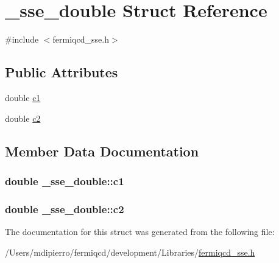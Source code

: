 \hypertarget{struct__sse__double}{
\section{\_\-sse\_\-double Struct Reference}
\label{struct__sse__double}
}


{\ttfamily \#include $<$fermiqcd\_\-sse.h$>$}\subsection*{Public Attributes}
\begin{DoxyCompactItemize}
\item 
double \hyperlink{struct__sse__double_ae836d9b3bbe4d5dd56db23bad413eab2}{c1}
\item 
double \hyperlink{struct__sse__double_aa9626ee275f9a06ca1f1b81a66af19d4}{c2}
\end{DoxyCompactItemize}


\subsection{Member Data Documentation}
\hypertarget{struct__sse__double_ae836d9b3bbe4d5dd56db23bad413eab2}{
\subsubsection[{c1}]{\setlength{\rightskip}{0pt plus 5cm}double {\bf \_\-sse\_\-double::c1}}}
\label{struct__sse__double_ae836d9b3bbe4d5dd56db23bad413eab2}
\hypertarget{struct__sse__double_aa9626ee275f9a06ca1f1b81a66af19d4}{
\subsubsection[{c2}]{\setlength{\rightskip}{0pt plus 5cm}double {\bf \_\-sse\_\-double::c2}}}
\label{struct__sse__double_aa9626ee275f9a06ca1f1b81a66af19d4}


The documentation for this struct was generated from the following file:\begin{DoxyCompactItemize}
\item 
/Users/mdipierro/fermiqcd/development/Libraries/\hyperlink{fermiqcd__sse_8h}{fermiqcd\_\-sse.h}\end{DoxyCompactItemize}
